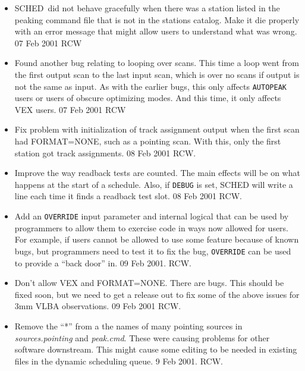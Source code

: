 \documentclass{report}
\newcommand{\schedb}{{\sc SCHED~}}
\begin{document}
\begin{itemize}

\item  \schedb did not behave gracefully when there was a station listed
       in the peaking command file that is not in the stations catalog.
       Make it die properly with an error message that might allow
       users to understand what was wrong.  07 Feb 2001  RCW

\item  Found another bug relating to looping over scans.  This time
       a loop went from the first output scan to the last input scan,
       which is over no scans if output is not the same as input.
       As with the earlier bugs, this only affects {\tt AUTOPEAK} users
       or users of obscure optimizing modes.  And this time, it only
       affects VEX users.  07 Feb 2001 RCW

\item  Fix problem with initialization of track assignment output when
       the first scan had FORMAT=NONE, such as a pointing scan.  With
       this, only the first station got track assignments.  08 Feb 2001 RCW.

\item  Improve the way readback tests are counted.  The main effects will
       be on what happens at the start of a schedule.  Also, if {\tt DEBUG}
       is set, SCHED will write a line each time it finds a readback
       test slot.  08 Feb 2001  RCW.

\item  Add an {\tt OVERRIDE} input parameter and internal logical that
       can be used by programmers to allow them to exercise code in
       ways now allowed for users.  For example, if users cannot be
       allowed to use some feature because of known bugs, but programmers
       need to test it to fix the bug, {\tt OVERRIDE} can be used to
       provide a ``back door'' in.  09 Feb 2001.  RCW.

\item  Don't allow VEX and FORMAT=NONE.  There are bugs.  This should
       be fixed soon, but we need to get a release out to fix some of
       the above issues for 3mm VLBA observations.  09 Feb 2001  RCW.

\item  Remove the ``*'' from a the names of many pointing sources in
       {\sl sources.pointing} and {\sl peak.cmd}.  These were causing
       problems for other software downstream.  This might cause some
       editing to be needed in existing files in the dynamic scheduling
       queue.  9 Feb 2001.  RCW.


\end{itemize}
\end{document}

